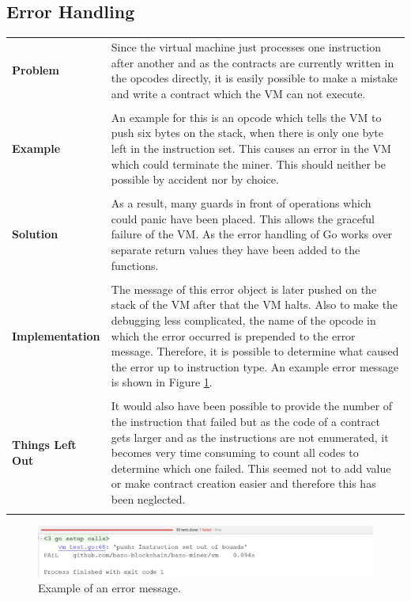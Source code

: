 \subsection{Error Handling}
\begin{tabular}[t]{ p{3cm} p{12.5cm}}
\raggedright
\textbf{Problem} &
Since the virtual machine just processes one instruction after another and as the contracts are currently written in the opcodes directly, it is easily possible to make a mistake and write a contract which the VM can not execute. \\ \\

\raggedright
\textbf{Example} &
An example for this is an opcode which tells the VM to push six bytes on the stack, when there is only one byte left in the instruction set. This causes an error in the VM which could terminate the miner. This should neither be possible by accident nor by choice. \\ \\

\raggedright
\textbf{Solution} &
As a result, many guards in front of operations which could panic have been placed. This allows the graceful failure of the VM. As the error handling of Go works over separate return values they have been added to the functions. \\ \\

\raggedright
\textbf{Implementation} &
The message of this error object is later pushed on the stack of the VM after that the VM halts. Also to make the debugging less complicated, the name of the opcode in which the error occurred is prepended to the error message. Therefore, it is possible to determine what caused the error up to instruction type. An example error message is shown in Figure \ref{pushtestfailure}. \\ \\

\raggedright
\textbf{Things Left Out} &
It would also have been possible to provide the number of the instruction that failed but as the code of a contract gets larger and as the instructions are not enumerated, it becomes very time consuming to count all codes to determine which one failed. This seemed not to add value or make contract creation easier and therefore this has been neglected. \\ \\
\end{tabular}

\begin{figure}[H]
	\begin{center}
	\includegraphics[width=\textwidth]{./images/push-test-failure}
	\caption{Example of an error message.}
	\label{pushtestfailure}
	\end{center}
\end{figure}

